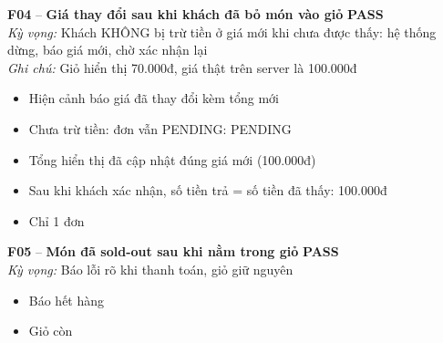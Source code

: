 \documentclass[a4paper,11pt]{article}
\newcommand{\ok}{\textcolor{okgreen}{\textbf{PASS}}}
\begin{document}
\begin{minipage}{\textwidth}\vspace{4pt}\textbf{\textcolor{brew}{F04}} -- \textbf{Giá thay đổi sau khi khách đã bỏ món vào giỏ} \hfill \ok\\
{\small\emph{Kỳ vọng:} Khách KHÔNG bị trừ tiền ở giá mới khi chưa được thấy: hệ thống dừng, báo giá mới, chờ xác nhận lại}
\\{\small\emph{Ghi chú:} Giỏ hiển thị 70.000đ, giá thật trên server là 100.000đ}
\end{minipage}
\begin{itemize}\footnotesize
\item \tick Hiện cảnh báo giá đã thay đổi kèm tổng mới
\item \tick Chưa trừ tiền: đơn vẫn PENDING: PENDING
\item \tick Tổng hiển thị đã cập nhật đúng giá mới (100.000đ)
\item \tick Sau khi khách xác nhận, số tiền trả = số tiền đã thấy: 100.000đ
\item \tick Chỉ 1 đơn
\end{itemize}
\begin{minipage}{\textwidth}\vspace{4pt}\textbf{\textcolor{brew}{F05}} -- \textbf{Món đã sold-out sau khi nằm trong giỏ} \hfill \ok\\
{\small\emph{Kỳ vọng:} Báo lỗi rõ khi thanh toán, giỏ giữ nguyên}
\end{minipage}
\begin{itemize}\footnotesize
\item \tick Báo hết hàng
\item \tick Giỏ còn
\end{itemize}
\end{document}
